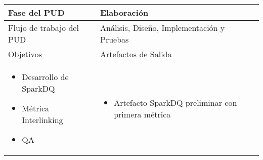 \vspace{1cm}
\begin{tabular}{|p{}|p{}|}

\hline

\cellcolor[gray]{0.7}Fase del \acs{PUD} & Elaboración
 \\
\hline

\cellcolor[gray]{0.7}Flujo de trabajo del \acs{PUD} & Análisis, Diseño,
Implementación y Pruebas
 \\
\hline

\cellcolor[gray]{0.7}Objetivos  &
\cellcolor[gray]{0.7}Artefactos de Salida \\
\hline

\begin{itemize}
\item Desarrollo de SparkDQ
\item Métrica Interlinking
\item \acs{QA}
\end{itemize}

&

\begin{itemize}
\item Artefacto SparkDQ preliminar con primera métrica
\end{itemize}
\\
\hline
\end{tabular}


